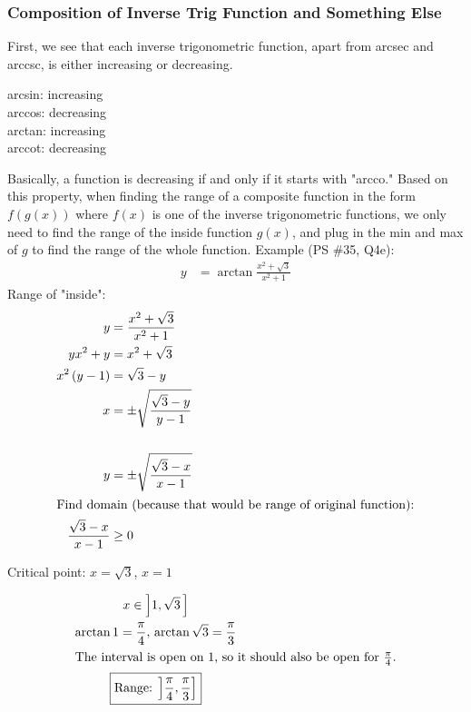 \documentclass{article}
\begin{document}
\subsubsection{Composition of Inverse Trig Function and Something Else}
First, we see that each inverse trigonometric function, apart from
arcsec and arccsc, is either increasing or decreasing.
\begin{center}
	arcsin: increasing \\
	arccos: decreasing \\
	arctan: increasing \\
	arccot: decreasing \\
\end{center}
Basically, a function is decreasing if and only if it starts with
"arcco." Based on this property, when finding the range of a composite
function in the form $f\left(g\left(x\right)\right)$ where $f\left(x
\right)$ is one of the inverse trigonometric functions, we only need
to find the range of the inside function $g\left(x\right)$, and plug
in the min and max of $g$ to find the range of the whole function.
Example (PS \#35, Q4e):
\begin{align*}
	y&=\arctan\frac{x^2+\sqrt{3}}{x^2+1}
\end{align*}
Range of "inside":
\begin{align*}
	y&=\frac{x^2+\sqrt{3}}{x^2+1} \\
	yx^2+y&=x^2+\sqrt{3} \\
	x^2\left(y-1\right)&=\sqrt{3}-y \\
	x&=\pm\sqrt{\frac{\sqrt{3}-y}{y-1}} \\
	\\
	y&=\pm\sqrt{\frac{\sqrt{3}-x}{x-1}} \\
	\intertext{\centering{Find domain (because that would be range
		of original function):}}
	\frac{\sqrt{3}-x}{x-1}&\geq0
\end{align*}
\begin{center}
Critical point: $x=\sqrt{3}$, $x=1$ \\
\end{center}
\begin{gather*}
	x\in\interval[scaled,open left]{1}{\sqrt{3}\,} \\
	\arctan1=\frac{\pi}{4},\,\arctan\sqrt{3}=\frac{\pi}{3} \\
	\intertext{\centering{The interval is open on 1, so it should
		also be open for $\frac{\pi}{4}$.}}
	\boxed{\text{Range: }\interval[scaled,open left]
		{\frac{\pi}{4}}{\frac{\pi}{3}}} \\
\end{gather*}
\end{document}
